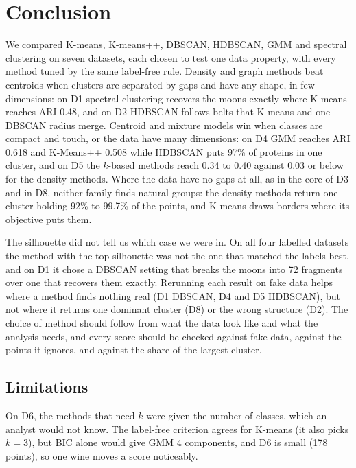 \section{Conclusion}\label{sec:conclusion}
We compared K-means, K-means++, DBSCAN, HDBSCAN, GMM and spectral clustering on seven datasets, each
chosen to test one data property, with every method tuned by the same label-free rule. Density and graph
methods beat centroids when clusters are separated by gaps and have any shape, in few dimensions: on D1
spectral clustering recovers the moons exactly where K-means reaches ARI 0.48, and on D2 HDBSCAN follows
belts that K-means and one DBSCAN radius merge. Centroid and mixture models win when classes are compact
and touch, or the data have many dimensions: on D4 GMM reaches ARI 0.618 and K-Means++ 0.508 while
HDBSCAN puts 97\% of proteins in one cluster, and on D5 the $k$-based methods reach 0.34 to 0.40 against
0.03 or below for the density methods. Where the data have no gaps at all, as in the core of D3 and in
D8, neither family finds natural groups: the density methods return one cluster holding 92\% to 99.7\% of
the points, and K-means draws borders where its objective puts them.

The silhouette did not tell us which case we were in. On all four labelled datasets the method with the
top silhouette was not the one that matched the labels best, and on D1 it chose a DBSCAN setting that
breaks the moons into 72 fragments over one that recovers them exactly. Rerunning each result on fake
data helps where a method finds nothing real (D1 DBSCAN, D4 and D5 HDBSCAN), but not where it returns one
dominant cluster (D8) or the wrong structure (D2). The choice of method should follow from what the data
look like and what the analysis needs, and every score should be checked against fake data, against the
points it ignores, and against the share of the largest cluster.

\subsection*{Limitations}
\habegin
\hatag{}On D6, the methods that need $k$ were given the number of classes, which an analyst would not
know. The label-free criterion agrees for K-means (it also picks $k=3$), but BIC alone would give GMM 4
components, and D6 is small (178 points), so one wine moves a score noticeably.
\haend

